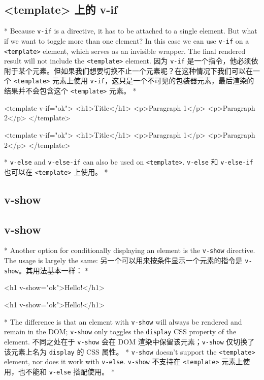 \begin{paracol}{2}
\subsection{\textless template\textgreater{} 上的 v-if}
\switchcolumn[0]*%
Because \texttt{v-if} is a directive, it has to be attached to a single
element. But what if we want to toggle more than one element? In this
case we can use \texttt{v-if} on a
\texttt{\textless{}template\textgreater{}} element, which serves as an
invisible wrapper. The final rendered result will not include the
\texttt{\textless{}template\textgreater{}} element.
\switchcolumn
因为 \texttt{v-if}
是一个指令，他必须依附于某个元素。但如果我们想要切换不止一个元素呢？在这种情况下我们可以在一个
\texttt{\textless{}template\textgreater{}} 元素上使用
\texttt{v-if}，这只是一个不可见的包装器元素，最后渲染的结果并不会包含这个
\texttt{\textless{}template\textgreater{}} 元素。
\switchcolumn[0]*%
\begin{codeHtml}
<template v-if="ok">
  <h1>Title</h1>
  <p>Paragraph 1</p>
  <p>Paragraph 2</p>
</template>
\end{codeHtml}
\switchcolumn
\begin{codeHtml}
<template v-if="ok">
  <h1>Title</h1>
  <p>Paragraph 1</p>
  <p>Paragraph 2</p>
</template>
\end{codeHtml}
\switchcolumn[0]*%
\texttt{v-else} and \texttt{v-else-if} can also be used on
\texttt{\textless{}template\textgreater{}}.
\switchcolumn
\texttt{v-else} 和 \texttt{v-else-if} 也可以在
\texttt{\textless{}template\textgreater{}} 上使用。
\switchcolumn[0]*%
\subsection{v-show}
\switchcolumn
\subsection{v-show}
\switchcolumn[0]*%
Another option for conditionally displaying an element is the
\texttt{v-show} directive. The usage is largely the same:
\switchcolumn
另一个可以用来按条件显示一个元素的指令是
\texttt{v-show}。其用法基本一样：
\switchcolumn[0]*%
\begin{codeHtml}
<h1 v-show="ok">Hello!</h1>
\end{codeHtml}
\switchcolumn
\begin{codeHtml}
<h1 v-show="ok">Hello!</h1>
\end{codeHtml}
\switchcolumn[0]*%
The difference is that an element with \texttt{v-show} will always be
rendered and remain in the DOM; \texttt{v-show} only toggles the
\texttt{display} CSS property of the element.
\switchcolumn
不同之处在于 \texttt{v-show} 会在 DOM 渲染中保留该元素；\texttt{v-show}
仅切换了该元素上名为 \texttt{display} 的 CSS 属性。
\switchcolumn[0]*%
\texttt{v-show} doesn't support the
\texttt{\textless{}template\textgreater{}} element, nor does it work
with \texttt{v-else}.
\switchcolumn
\texttt{v-show} 不支持在 \texttt{\textless{}template\textgreater{}}
元素上使用，也不能和 \texttt{v-else} 搭配使用。
\switchcolumn[0]*%

\end{paracol}
